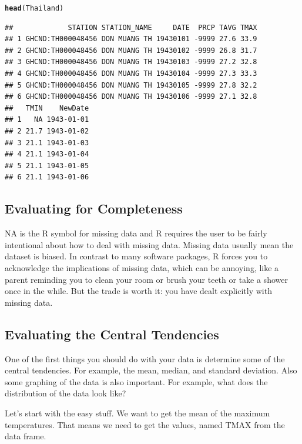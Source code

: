 \documentclass{article}\usepackage[]{graphicx}\usepackage[]{color}
\makeatletter
\newcommand{\hlstd}[1]{\textcolor[rgb]{0.345,0.345,0.345}{#1}}%
\newcommand{\hlkwd}[1]{\textcolor[rgb]{0.737,0.353,0.396}{\textbf{#1}}}%
\newenvironment{kframe}{%
 \def\at@end@of@kframe{}%
 \ifinner\ifhmode%
  \def\at@end@of@kframe{\end{minipage}}%
  \begin{minipage}{\columnwidth}%
 \fi\fi%
 \def\FrameCommand##1{\hskip\@totalleftmargin \hskip-\fboxsep
 \colorbox{shadecolor}{##1}\hskip-\fboxsep
     \hskip-\linewidth \hskip-\@totalleftmargin \hskip\columnwidth}%
 \MakeFramed {\advance\hsize-\width
   \@totalleftmargin\z@ \linewidth\hsize
   \@setminipage}}%
 {\par\unskip\endMakeFramed%
 \at@end@of@kframe}
\newenvironment{knitrout}{}{} %
\makeatother
\begin{document}
\begin{knitrout}
\color{fgcolor}\begin{kframe}
\begin{alltt}
\hlkwd{head}\hlstd{(Thailand)}
\end{alltt}
\begin{verbatim}
##             STATION STATION_NAME     DATE  PRCP TAVG TMAX
## 1 GHCND:TH000048456 DON MUANG TH 19430101 -9999 27.6 33.9
## 2 GHCND:TH000048456 DON MUANG TH 19430102 -9999 26.8 31.7
## 3 GHCND:TH000048456 DON MUANG TH 19430103 -9999 27.2 32.8
## 4 GHCND:TH000048456 DON MUANG TH 19430104 -9999 27.3 33.3
## 5 GHCND:TH000048456 DON MUANG TH 19430105 -9999 27.8 32.2
## 6 GHCND:TH000048456 DON MUANG TH 19430106 -9999 27.1 32.8
##   TMIN    NewDate
## 1   NA 1943-01-01
## 2 21.7 1943-01-02
## 3 21.1 1943-01-03
## 4 21.1 1943-01-04
## 5 21.1 1943-01-05
## 6 21.1 1943-01-06
\end{verbatim}
\end{kframe}
\end{knitrout}


\subsection{Evaluating for Completeness}

NA is the R symbol for missing data and R requires the user to be fairly intentional about how to deal with missing data. Missing data usually mean the dataset is biased. In contrast to many software packages, R forces you to acknowledge the implications of missing data, which can be annoying, like a parent reminding you to clean your room or brush your teeth or take a shower once in the while. But the trade is worth it: you have dealt explicitly with missing data.


\subsection{Evaluating the Central Tendencies}

One of the first things you should do with your data is determine some of the central tendencies. For example, the mean, median, and standard deviation. Also some graphing of the data is also important. For example, what does the distribution of the data look like?

Let's start with the easy stuff. We want to get the mean of the maximum temperatures. That means we need to get the values, named TMAX from the data frame. 
\end{document}
